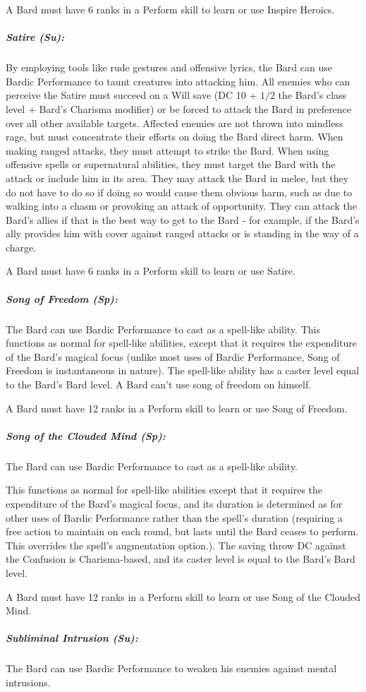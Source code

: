 A Bard must have 6 ranks in a Perform skill to learn or use Inspire Heroics.
\subparagraph{Satire (Su):}
By employing tools like rude gestures and offensive lyrics, the Bard can use Bardic Performance to taunt creatures into attacking him.
All enemies who can perceive the Satire must succeed on a Will save (DC 10 + $1/2$ the Bard's class level + Bard's Charisma modifier) or be forced to attack the Bard in preference over all other available targets.
Affected enemies are not thrown into mindless rage, but must concentrate their efforts on doing the Bard direct harm. When making ranged attacks, they must attempt to strike the Bard. When using offensive spells or supernatural abilities, they must target the Bard with the attack or include him in its area. They may attack the Bard in melee, but they do not have to do so if doing so would cause them obvious harm, such as due to walking into a chasm or provoking an attack of opportunity. They can attack the Bard's allies if that is the best way to get to the Bard - for example, if the Bard's ally provides him with cover against ranged attacks or is standing in the way of a charge.

A Bard must have 6 ranks in a Perform skill to learn or use Satire.
\subparagraph{Song of Freedom (Sp):}
The Bard can use Bardic Performance to cast  as a spell-like ability. This functions as normal for spell-like abilities, except that it requires the expenditure of the Bard's magical focus (unlike most uses of Bardic Performance, Song of Freedom is instantaneous in nature). The spell-like ability has a caster level equal to the Bard's Bard level.
A Bard can't use song of freedom on himself.

A Bard must have 12 ranks in a Perform skill to learn or use Song of Freedom.
\subparagraph{Song of the Clouded Mind (Sp):}
The Bard can use Bardic Performance to cast  as a spell-like ability.

This functions as normal for spell-like abilities except that it requires the expenditure of the Bard's magical focus, and its duration is determined as for other uses of Bardic Performance rather than the spell's duration (requiring a free action to maintain on each round, but lasts until the Bard ceases to perform. This overrides the spell's augmentation option.).
The saving throw DC against the Confusion is Charisma-based, and its caster level is equal to the Bard's Bard level.

A Bard must have 12 ranks in a Perform skill to learn or use Song of the Clouded Mind.
\subparagraph{Subliminal Intrusion (Su):}
The Bard can use Bardic Performance to weaken his enemies against mental intrusions.

